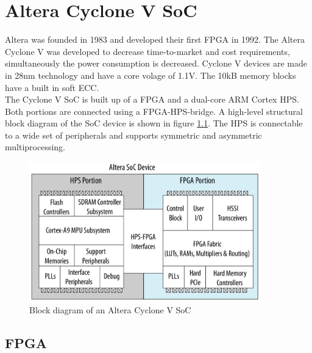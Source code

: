 \chapter{Altera Cyclone V SoC}
Altera was founded in 1983 and developed their first FPGA in 1992.\cite{althist16} The Altera Cyclone V was developed to decrease time-to-market and cost requirements, simultaneously the power consumption is decreased. Cyclone V devices are made in 28nm technology and have a core volage of 1.1V. The 10kB memory blocks have a built in soft ECC.\cite{altcycvov15}\\
The Cyclone V SoC is built up of a FPGA and a dual-core ARM Cortex HPS. Both portions are connected using a FPGA-HPS-bridge. A high-level structural block diagram of the SoC device is shown in figure \ref{fig:alterasocblocks}. The HPS is connectable to a wide set of peripherals and supports symmetric and asymmetric multiprocessing.
\begin{figure}[htbp]
\begin{center}
\includegraphics[width=10cm,keepaspectratio=true]{bilder/png/AlteraSoC}
\caption{Block diagram of an Altera Cyclone V SoC\cite[chapter 1]{AlteraHPS15}}
\label{fig:alterasocblocks}
\end{center}
\end{figure}
\section{FPGA}
